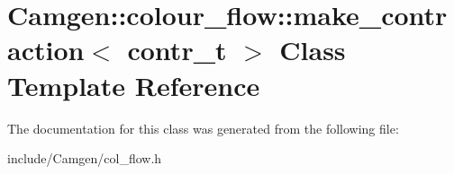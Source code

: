 \hypertarget{a00342}{}\section{Camgen\+:\+:colour\+\_\+flow\+:\+:make\+\_\+contraction$<$ contr\+\_\+t $>$ Class Template Reference}
\label{a00342}


The documentation for this class was generated from the following file\+:\begin{DoxyCompactItemize}
\item 
include/\+Camgen/col\+\_\+flow.\+h\end{DoxyCompactItemize}
